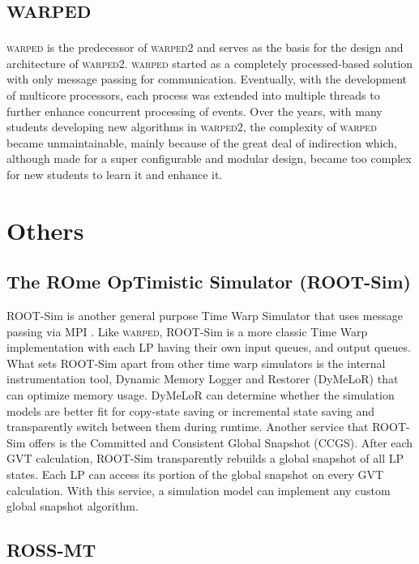 \documentclass[11pt]{book}
\begin{document}
\section{\textsc{warped}}

\textsc{warped} is the predecessor of \textsc{warped2} and serves as the basis for the design
and architecture of \textsc{warped2}. \textsc{warped} started as a completely processed-based
solution with only message passing for communication. Eventually, with the development of
multicore processors, each process was extended into multiple threads to further enhance
concurrent processing of events. Over the years, with many students developing new algorithms
in \textsc{warped2}, the complexity of \textsc{warped} became unmaintainable, mainly because
of the great deal of indirection which, although made for a super configurable and modular
design, became too complex for new students to learn it and enhance it.

\section{Others}

\subsection{The ROme OpTimistic Simulator (ROOT-Sim)}

ROOT-Sim is another general purpose Time Warp Simulator that uses message passing via MPI
\cite{pellegrini-11}. Like \textsc{warped}, ROOT-Sim is a more classic Time Warp
implementation with each LP having their own input queues, and output queues. What sets
ROOT-Sim apart from other time warp simulators is the internal instrumentation tool, Dynamic
Memory Logger and Restorer (DyMeLoR) that can optimize memory usage. DyMeLoR can determine
whether the simulation models are better fit for copy-state saving or incremental state
saving and transparently switch between them during runtime. Another service that ROOT-Sim
offers is the Committed and Consistent Global Snapshot (CCGS). After each GVT calculation,
ROOT-Sim transparently rebuilds a global snapshot of all LP states. Each LP can access its
portion of the global snapshot on every GVT calculation. With this service, a simulation
model can implement any custom global snapshot algorithm.

\subsection{ROSS-MT}
\end{document}
